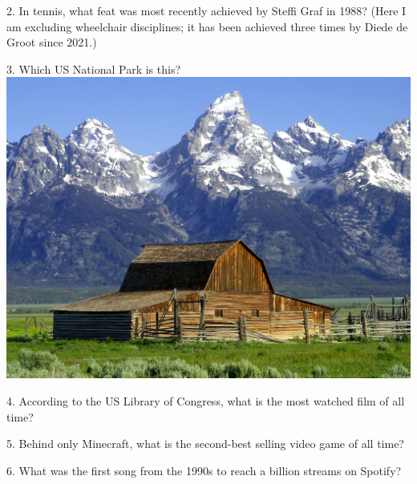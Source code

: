 \begin{frame}
\begin{center}
\Large
2. In tennis, what feat was most recently achieved by Steffi Graf in 1988? (Here I am excluding wheelchair disciplines; it has been achieved three times by Diede de Groot since 2021.)
\end{center}
\end{frame}
\begin{frame}
\begin{center}
\Large
3. Which US National Park is this?
\\
\vspace{0.5em}\includegraphics[height=0.6\paperheight]{images/grand_tetons.jpg}
\end{center}
\end{frame}
\begin{frame}
\begin{center}
\Large
4. According to the US Library of Congress, what is the most watched film of all time?
\end{center}
\end{frame}
\begin{frame}
\begin{center}
\Large
5. Behind only Minecraft, what is the second-best selling video game of all time?
\end{center}
\end{frame}
\begin{frame}
\begin{center}
\Large
6. What was the first song from the 1990s to reach a billion streams on Spotify?
\end{center}
\end{frame}
